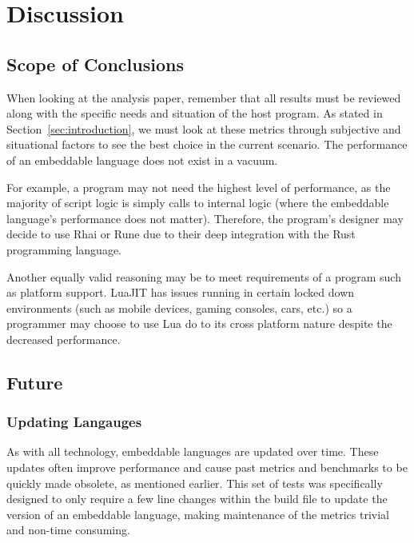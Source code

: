 \section{Discussion} \label{sec:discussion}

\subsection{Scope of Conclusions} \label{sec:discussion:importance}
When looking at the analysis paper, remember that all results must be reviewed along with the specific needs and situation of the host program. As stated in Section~\ref{sec:introduction}, we must look at these metrics through subjective and situational factors to see the best choice in the current scenario. The performance of an embeddable language does not exist in a vacuum.

For example, a program may not need the highest level of performance, as the majority of script logic is simply calls to internal logic (where the embeddable language's performance does not matter). Therefore, the program's designer may decide to use Rhai or Rune due to their deep integration with the Rust programming language.

Another equally valid reasoning may be to meet requirements of a program such as platform support. LuaJIT has issues running in certain locked down environments\cite{luajit:consoles} (such as mobile devices, gaming consoles, cars, etc.) so a programmer may choose to use Lua do to its cross platform nature despite the decreased performance.

\subsection{Future}

\subsubsection{Updating Langauges}
As with all technology, embeddable languages are updated over time. These updates often improve performance and cause past metrics and benchmarks to be quickly made obsolete, as mentioned earlier. This set of tests was specifically designed to only require a few line changes within the build file to update the version of an embeddable language, making maintenance of the metrics trivial and non-time consuming.


